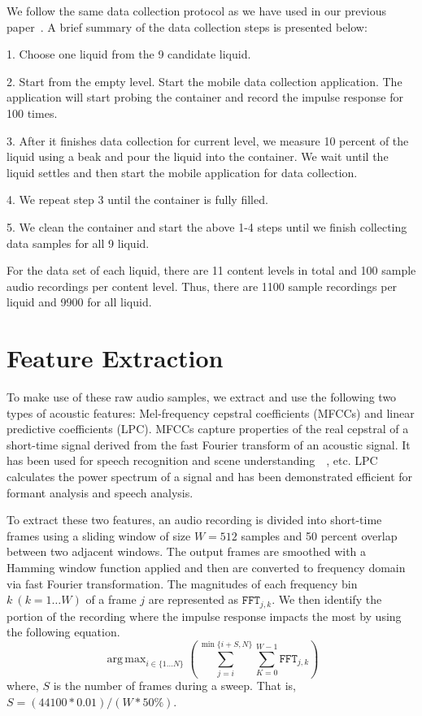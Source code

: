 \documentclass{article} %
\DeclareMathOperator*{\argmax}{arg\,max}
\begin{document}
We follow the same data collection protocol as we have used in our previous paper~\cite{fan2015soqr}. A brief summary of the data collection steps is presented below:

1. Choose one liquid from the 9 candidate liquid.

2. Start from the empty level. Start the mobile data collection application. The application will start probing the container and record the impulse response for 100 times.

3. After it finishes data collection for current level, we measure 10 percent of the liquid using a beak and pour the liquid into the container. We wait until the liquid settles and then start the mobile application for data collection.

4. We repeat step 3 until the container is fully filled.

5. We clean the container and start the above 1-4 steps until we finish collecting data samples for all 9 liquid.

For the data set of each liquid, there are 11 content levels in total and 100 sample audio recordings per content level. Thus, there are 1100 sample recordings per liquid and 9900 for all liquid.   

\section{Feature Extraction}
To make use of these raw audio samples, we extract and use the following two types of acoustic features: Mel-frequency cepstral coefficients (MFCCs) and linear predictive coefficients (LPC). MFCCs capture properties of the real cepstral of a short-time signal derived from the fast Fourier transform of an acoustic signal. It has been used for speech recognition and scene understanding~\cite{kunze2007symbolic}~\cite{fan2014public}, etc. LPC calculates the power spectrum of a signal and has been demonstrated efficient for formant analysis and speech analysis. 

To extract these two features, an audio recording is divided into short-time frames using a sliding window of size $W = 512$ samples and 50 percent overlap between two adjacent windows. The output frames are smoothed with a Hamming window function applied and then are converted to frequency domain via fast Fourier transformation. The magnitudes of each frequency bin $k\ (k=1\dots W)$ of a frame $j$ are represented as $\mathtt{FFT}_{j,k}$. We then identify the portion of the recording where the impulse response impacts the most by using the following equation.
\[\argmax_{i\in\{1\dots N\}}\left(\sum_{j=i}^{\min \{i+S, N\}}\sum_{K=0}^{W-1}\mathtt{FFT}_{j,k}\right)\]
where, $S$ is the number of frames during a sweep. That is, $S=(44100*0.01)/(W*50\%)$.
\end{document}
